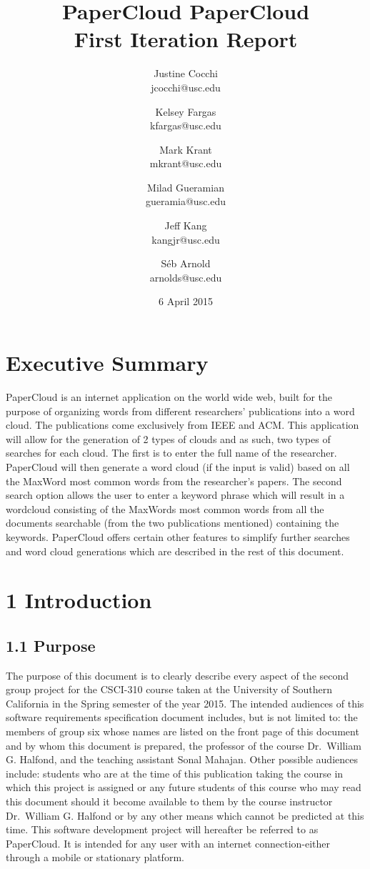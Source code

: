 \documentclass[]{article}
\title{PaperCloud}
\author{Justine Cocchi\\jcocchi@usc.edu \and Kelsey Fargas\\kfargas@usc.edu \and Mark Krant \\ mkrant@usc.edu\and Milad Gueramian\\gueramia@usc.edu \and Jeff Kang\\kangjr@usc.edu \and Séb Arnold\\arnolds@usc.edu}
\date{6 April 2015}
\title{%
	PaperCloud \\
	\large First Iteration Report}
\begin{document}
\clearpage\maketitle
\thispagestyle{empty}

\pagebreak

\tableofcontents
\setcounter{tocdepth}{3}
\thispagestyle{empty}

\pagebreak

\section{Executive Summary}\label{executive-summary}

PaperCloud is an internet application on the world wide web, built for
the purpose of organizing words from different researchers' publications
into a word cloud. The publications come exclusively from IEEE and ACM.
This application will allow for the generation of 2 types of clouds and
as such, two types of searches for each cloud. The first is to enter the
full name of the researcher. PaperCloud will then generate a word cloud
(if the input is valid) based on all the MaxWord most common words from
the researcher's papers. The second search option allows the user to
enter a keyword phrase which will result in a wordcloud consisting of
the MaxWords most common words from all the documents searchable (from
the two publications mentioned) containing the keywords. PaperCloud
offers certain other features to simplify further searches and word
cloud generations which are described in the rest of this document.

\pagebreak

\section{1 Introduction}\label{introduction}

\subsection{1.1 Purpose}\label{purpose}

The purpose of this document is to clearly describe every aspect of the
second group project for the CSCI-310 course taken at the University of
Southern California in the Spring semester of the year 2015. The
intended audiences of this software requirements specification document
includes, but is not limited to: the members of group six whose names
are listed on the front page of this document and by whom this document
is prepared, the professor of the course Dr.~William G. Halfond, and the
teaching assistant Sonal Mahajan. Other possible audiences include:
students who are at the time of this publication taking the course in
which this project is assigned or any future students of this course who
may read this document should it become available to them by the course
instructor Dr.~William G. Halfond or by any other means which cannot be
predicted at this time. This software development project will hereafter
be referred to as PaperCloud. It is intended for any user with an
internet connection-either through a mobile or stationary platform.
\end{document}
